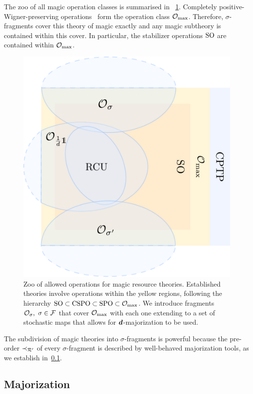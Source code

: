 The zoo of all magic operation classes is summarised in ~\cref{fig:zoo}.
Completely positive-Wigner-preserving operations~\cite{cit:wang} form the operation class $\mathcal{O}_{\rm{}max}$.
Therefore, $\sigma$-fragments cover this theory of magic exactly and any magic subtheory is contained within this cover.
In particular, the stabilizer operations ${\rm{SO}}$ are contained within $\mathcal{O}_{\rm{}max}$.
\begin{figure}[t]
    \centering
        \includegraphics[scale=0.47
        ]{sections/major/operations.pdf}
    \caption{Zoo of allowed operations for magic resource theories.
    Established theories involve operations within the yellow regions, following the hierarchy ${\rm{SO}} \subset {\rm{CSPO}} \subset {\rm{SPO}} \subset \mathcal{O}_{\rm{}max}$.
    We introduce fragments $\mathcal{O}_\sigma,\ \sigma \in \mathcal{F}$ that cover $\mathcal{O}_{\rm{}max}$ with each one extending to a set of stochastic maps that allows for $\bm{d}$-majorization to be used.
    }
    \label{fig:zoo}
\end{figure}

The subdivision of magic theories into $\sigma$-fragments is powerful because the pre-order $\prec_{\mathcal{R}'}$ of every $\sigma$-fragment is described by well-behaved majorization tools, as we establish in~\cref{sec:major}. 

\subsection{Majorization}\label{sec:major}

